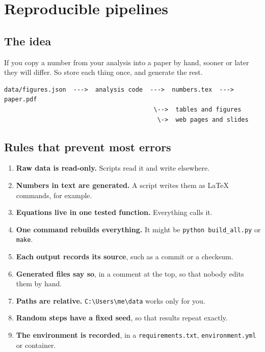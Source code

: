 \chapter{Reproducible pipelines}
\label{ch:pipelines}

\section{The idea}\label{the-idea}

If you copy a number from your analysis into a paper by hand, sooner or later they will differ. So store each thing once, and generate the rest.

\begin{lstlisting}[language=text]
data/figures.json  --->  analysis code  --->  numbers.tex  --->  paper.pdf
                                         \-->  tables and figures
                                          \->  web pages and slides
\end{lstlisting}

\section{Rules that prevent most errors}\label{rules-that-prevent-most-errors}

\begin{enumerate}
\def\labelenumi{\arabic{enumi}.}
\tightlist
\item
  \textbf{Raw data is read-only.} Scripts read it and write elsewhere.
\item
  \textbf{Numbers in text are generated.} A script writes them as LaTeX commands, for example.
\item
  \textbf{Equations live in one tested function.} Everything calls it.
\item
  \textbf{One command rebuilds everything.} It might be \texttt{python\ build\_all.py} or \texttt{make}.
\item
  \textbf{Each output records its source}, such as a commit or a checksum.
\item
  \textbf{Generated files say so}, in a comment at the top, so that nobody edits them by hand.
\item
  \textbf{Paths are relative.} \texttt{C:\textbackslash{}Users\textbackslash{}me\textbackslash{}data} works only for you.
\item
  \textbf{Random steps have a fixed seed}, so that results repeat exactly.
\item
  \textbf{The environment is recorded}, in a \texttt{requirements.txt}, \texttt{environment.yml} or container.
\end{enumerate}

